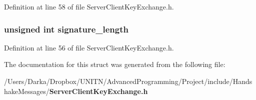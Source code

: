Definition at line 58 of file Server\+Client\+Key\+Exchange.\+h.

\subsubsection[{signature\+\_\+length}]{\setlength{\rightskip}{0pt plus 5cm}unsigned int signature\+\_\+length}\label{struct_d_h_e__server__key__exchange_a23a683d5129246d9adbd0029612d06a8}


Definition at line 56 of file Server\+Client\+Key\+Exchange.\+h.



The documentation for this struct was generated from the following file\+:\begin{DoxyCompactItemize}
\item 
/\+Users/\+Darka/\+Dropbox/\+U\+N\+I\+T\+N/\+Advanced\+Programming/\+Project/include/\+Handshake\+Messages/{\bf Server\+Client\+Key\+Exchange.\+h}\end{DoxyCompactItemize}
